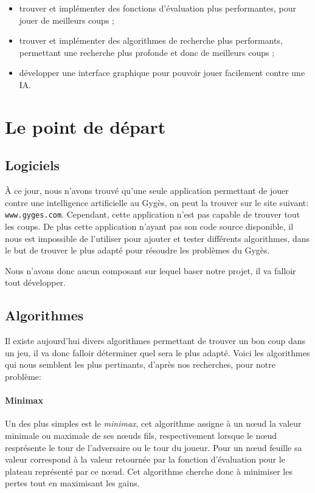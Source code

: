 \documentclass[a4paper]{article}
\begin{document}
\begin{itemize}
			\vspace{1em}
			\item trouver et implémenter des fonctions d'évaluation plus performantes,
				pour jouer de meilleurs coups ;

			\vspace{1em}
			\item trouver et implémenter des algorithmes de recherche plus performants,
				permettant une recherche plus profonde et donc de meilleurs coups ;

			\vspace{1em}
			\item développer une interface graphique pour pouvoir jouer facilement contre
				une IA.
		\end{itemize}

\section{Le point de départ}

	\subsection{Logiciels}
		\`A ce jour, nous n'avons trouvé qu'une seule application permettant de jouer
		contre une intelligence artificielle au Gygès, on peut la trouver sur le site suivant: \\
		\texttt{www.gyges.com}.
		Cependant, cette application n'est pas capable de trouver tout les coups. De plus
		cette application n'ayant pas son code source disponible, il nous est impossible de l'utiliser pour ajouter et
		tester différents algorithmes, dans le but de trouver le plus adapté pour résoudre les
		problèmes du Gygès.


		Nous n'avons donc aucun composant sur lequel baser notre projet, il va falloir tout développer.

	\subsection{Algorithmes}
		Il existe aujourd'hui divers algorithmes permettant de trouver un bon coup dans un jeu,
		il va donc falloir déterminer quel sera le plus adapté. Voici les algorithmes qui nous semblent les
		plus pertinants, d'après nos recherches, pour notre problème:

		\paragraph{Minimax} Un des plus simples est le \emph{minimax}, cet algorithme assigne à un n\oe{}ud
		la valeur minimale ou maximale de ses n\oe{}uds fils, respectivement lorsque le n\oe{}ud resprésente
		le tour de l'adversaire ou le tour du joueur. Pour un n\oe{}ud feuille sa valeur correspond à la valeur
		retournée par la fonction d'évaluation pour le plateau représenté par ce n\oe{}ud. Cet algorithme cherche donc
		à minimiser les pertes tout en maximisant les gains.
\end{document}
